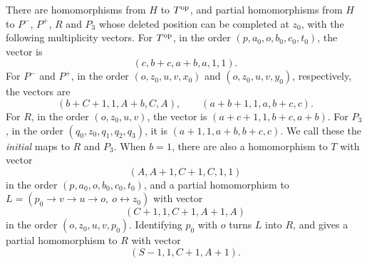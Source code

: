 \begin{lemma}
\label{boundary391:maps}\label{firstascent:maps}
\label{tworoots:maps}\label{rottriangle:profiles}
There are homomorphisms from $H$ to $T^{\rm op}$, and partial homomorphisms from $H$ to $P^-$, $P^+$, $R$ and $P_3$ whose deleted position can be completed at $z_0$, with the following multiplicity vectors. For $T^{\rm op}$, in the order $(p,a_0,o,b_0,c_0,t_0)$, the vector is
\begin{equation}\label{firstascent:T-profiles}
 (c,b+c,a+b,a,1,1).
\end{equation}
For $P^-$ and $P^+$, in the order $(o,z_0,u,v,x_0)$ and $(o,z_0,u,v,y_0)$, respectively, the vectors are
\begin{equation}\label{tworoots:punctures}
 (b+C+1,1,A+b,C,A),\qquad(a+b+1,1,a,b+c,c).
\end{equation}
For $R$, in the order $(o,z_0,u,v)$, the vector is $(a+c+1,1,b+c,a+b)$. For $P_3$, in the order $(q_0,z_0,q_1,q_2,q_3)$, it is
$(a+1,1,a+b,b+c,c)$. We call these the \emph{initial} maps to $R$ and $P_3$.
When $b=1$, there are also a homomorphism to $T$ with vector
\[
 (A,A+1,C+1,C,1,1)
\]
in the order $(p,a_0,o,b_0,c_0,t_0)$, and a partial homomorphism to
$L=(p_0\to v\to u\to o,\ o\leftrightarrow z_0)$ with vector
\[
 (C+1,1,C+1,A+1,A)
\]
in the order $(o,z_0,u,v,p_0)$. Identifying $p_0$ with $o$ turns $L$ into $R$, and gives a partial homomorphism to $R$ with vector
\begin{equation}\label{rottriangle:two-profiles}
 (S-1,1,C+1,A+1).
\end{equation}
\end{lemma}
